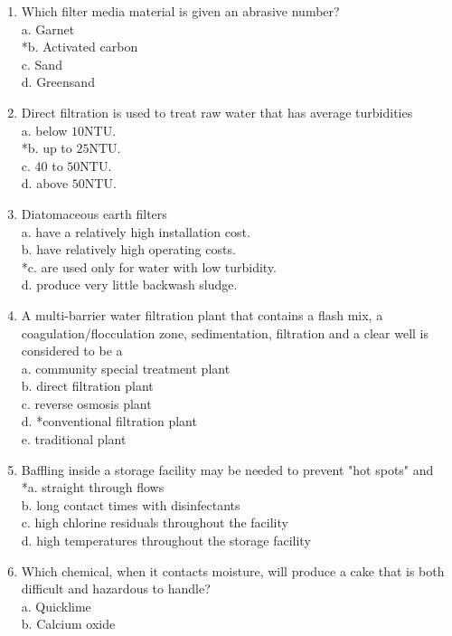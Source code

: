 \begin{enumerate}
\item Which filter media material is given an abrasive number?\\
a. Garnet\\
*b. Activated carbon\\
c. Sand\\
d. Greensand\\
\item Direct filtration is used to treat raw water that has average turbidities\\
a. below $10 \mathrm{NTU}$.\\
*b. up to $25 \mathrm{NTU}$.\\
c. 40 to $50 \mathrm{NTU}$.\\
d. above $50 \mathrm{NTU}$.\\
\item Diatomaceous earth filters\\
a. have a relatively high installation cost.\\
b. have relatively high operating costs.\\
*c. are used only for water with low turbidity.\\
d. produce very little backwash sludge.\\
\item A multi-barrier water filtration plant that contains a flash mix, a coagulation/flocculation zone, sedimentation, filtration and a clear well is considered to be a\\
a. community special treatment plant\\
b. direct filtration plant\\
c. reverse osmosis plant\\
d. *conventional filtration plant\\
e. traditional plant
\item Baffling inside a storage facility may be needed to prevent "hot spots" and\\
*a. straight through flows\\
b. long contact times with disinfectants\\
c. high chlorine residuals throughout the facility\\
d. high temperatures throughout the storage facility\\
\item Which chemical, when it contacts moisture, will produce a cake that is both difficult and hazardous to handle?\\
a. Quicklime\\
b. Calcium oxide\\

\end{enumerate}
